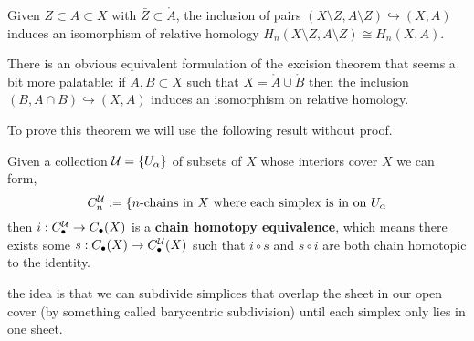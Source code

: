 \documentclass[a4paper]{article}
\begin{document}
\begin{theorem}[Excision]
    Given $Z\subset A \subset X$ with $\bar{Z}\subset \mathring{A}$, the inclusion of pairs $(X\setminus Z,A\setminus Z)\hookrightarrow (X,A)$ induces an isomorphism of relative homology $H_n(X\setminus Z,A\setminus Z)\cong H_n(X,A)$.
\end{theorem}
There is an obvious equivalent formulation of the excision theorem that seems a bit more palatable: if $A,B\subset X$ such that $X=\mathring{A}\cup\mathring{B}$ then the inclusion $(B,A\cap B)\hookrightarrow (X,A)$ induces an isomorphism on relative homology.

To prove this theorem we will use the following result without proof.
\begin{proposition}
    Given a collection $\mathcal{U}=\{U_\alpha\}$ of subsets of $X$ whose interiors cover $X$ we can form,\[
        C_n^{\mathcal{U}}:=\{\text{$n$-chains in  $X$ where each simplex is in on $U_\alpha$}
    \] then $i:C_\bullet^{\mathcal{U}}\rightarrow C_\bullet(X)$ is a \textbf{chain homotopy equivalence}, which means there exists some $s:C_\bullet(X)\rightarrow C_\bullet^{\mathcal{U}}(X)$ such that $i\circ s$ and $s\circ i$ are both chain homotopic to the identity.
\end{proposition}
the idea is that we can subdivide simplices that overlap the sheet in our open cover (by something called barycentric subdivision) until each simplex only lies in one sheet.
\end{document}
